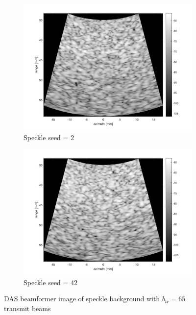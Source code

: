\begin{figure}[ht]
    \centering
    \begin{subfigure}[t]{0.48\linewidth}
        \includegraphics[width=\linewidth]{./images/results/2.3/speckle2.png}
        \caption{Speckle seed = 2}
    \end{subfigure}
    \quad
    \begin{subfigure}[t]{0.48\linewidth}
        \includegraphics[width=\linewidth]{./images/results/2.3/speckle42.png}
        \caption{Speckle seed = 42}
    \end{subfigure}
	\caption{DAS beamformer image of speckle background with $b_{tr}=65$ transmit beams}
	\label{fig:speckle}
\end{figure}


